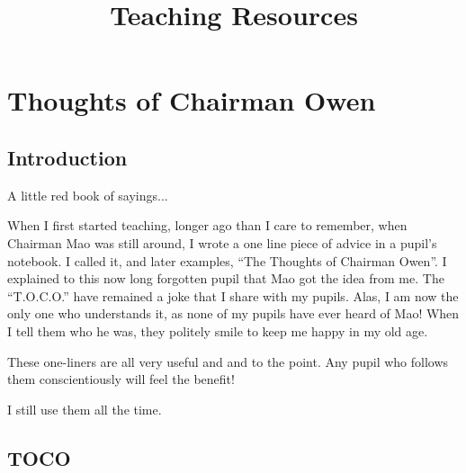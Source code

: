 \documentclass{article}
\title{Teaching Resources}
\date{}
\begin{document}
\maketitle
\tableofcontents

\newpage
\section{Thoughts of Chairman Owen}

\subsection{Introduction}

A little red book of sayings...

When I first started teaching, longer ago than I care to remember, when Chairman Mao was still around, I wrote a one line piece of advice in a pupil's notebook.
I called it, and later examples, ``The Thoughts of Chairman Owen''.
I explained to this now long forgotten pupil that Mao got the idea from me.
The ``T.O.C.O.'' have remained a joke that I share with my pupils.
Alas, I am now the only one who understands it, as none of my pupils have ever heard of Mao!
When I tell them who he was, they politely smile to keep me happy in my old age.

These one-liners are all very useful and and to the point.
Any pupil who follows them conscientiously will feel the benefit!

I still use them all the time.

\subsection{TOCO}
\end{document}

